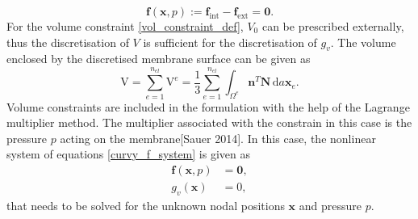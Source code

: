  \begin{equation} \label{curvy_f_system}
    \mathbf{f}\left(\mathbf{x}, p\right) := \mathbf{f}_{\text{int}} - \mathbf{f}_{\text{ext}} = \boldsymbol{0}.
 \end{equation} 
For the volume constraint \eqref{vol_constraint_def}, $V_{0}$ can be prescribed externally, thus the discretisation of $V$ is sufficient
 for the discretisation of $g_{v}$. The volume enclosed by the discretised membrane surface can be given as
 \begin{equation} \label{discretised_volume_constraint}
    \mathrm{V} = \sum_{e=1}^{n_{el}} \mathrm{V}^{e} = \frac{1}{3} \sum_{e=1}^{n_{el}} \int_{\Omega^{e}} \boldsymbol{n}^{T} \mathbf{N}\,\mathrm{d}a \mathbf{x}_{e}.
 \end{equation}
Volume constraints are included in the formulation with the help of the Lagrange multiplier method. The multiplier associated
 with the constrain in this case is the pressure $p$ acting on the membrane[Sauer 2014]. In this case, the nonlinear system of equations \eqref{curvy_f_system} is given as
 \begin{align} \label{curvy_f_constrained}
    \mathbf{f}\left(\mathbf{x}, p\right) &= \boldsymbol{0},\\
    g_{v} \left(\mathbf{x}\right) &= 0,
 \end{align}
 that needs to be solved for the unknown nodal positions $\mathbf{x}$ and pressure $p$. 

%
%

